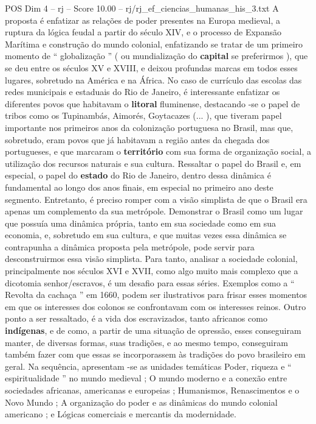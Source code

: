 \begin{textsample}{POS Dim 4 – rj – Score 10.00 – rj/rj\_ef\_ciencias\_humanas\_his\_3.txt}
A proposta é enfatizar as relações de poder presentes na Europa medieval, a ruptura da lógica feudal a partir do século XIV, e o processo de Expansão Marítima e construção do mundo colonial, enfatizando se tratar de um primeiro momento de “ globalização ” ( ou mundialização do \textbf{capital} se preferirmos ), que se deu entre os séculos XV e XVIII, e deixou profundas marcas em todos esses lugares, sobretudo na América e na África.
No caso de currículo das escolas das redes municipais e estaduais do Rio de Janeiro, é interessante enfatizar os diferentes povos que habitavam o \textbf{litoral} fluminense, destacando -se o papel de tribos como os Tupinambás, Aimorés, Goytacazes (... ), que tiveram papel importante nos primeiros anos da colonização portuguesa no Brasil, mas que, sobretudo, eram povos que já habitavam a região antes da chegada dos portugueses, e que marcaram o \textbf{território} com sua forma de organização social, a utilização dos recursos naturais e sua cultura.
Ressaltar o papel do Brasil e, em especial, o papel do \textbf{estado} do Rio de Janeiro, dentro dessa dinâmica é fundamental ao longo dos anos finais, em especial no primeiro ano deste segmento.
Entretanto, é preciso romper com a visão simplista de que o Brasil era apenas um complemento da sua metrópole.
Demonstrar o Brasil como um lugar que possuía uma dinâmica própria, tanto em sua sociedade como em sua economia, e, sobretudo em sua cultura, e que muitas vezes essa dinâmica se contrapunha a dinâmica proposta pela metrópole, pode servir para desconstruirmos essa visão simplista.
Para tanto, analisar a sociedade colonial, principalmente nos séculos XVI e XVII, como algo muito mais complexo que a dicotomia senhor/escravos, é um desafio para essas séries.
Exemplos como a “ Revolta da cachaça ” em 1660, podem ser ilustrativos para frisar esses momentos em que os interesses dos colonos se confrontavam com os interesses reinos.
Outro ponto a ser ressaltado, é a vida dos escravizados, tanto africanos como \textbf{indígenas}, e de como, a partir de uma situação de opressão, esses conseguiram manter, de diversas formas, suas tradições, e ao mesmo tempo, conseguiram também fazer com que essas se incorporassem às tradições do povo brasileiro em geral.
Na sequência, apresentam -se as unidades temáticas Poder, riqueza e “ espiritualidade ” no mundo medieval ; O mundo moderno e a conexão entre sociedades africanas, americanas e europeias ; Humanismos, Renascimentos e o Novo Mundo ; A organização do poder e as dinâmicas do mundo colonial americano ; e Lógicas comerciais e mercantis da modernidade.

\end{textsample}
